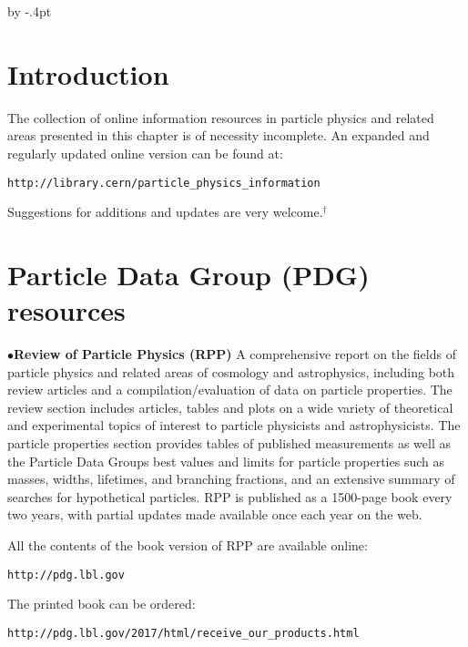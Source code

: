 %
\itemindent=10pt

\advance\baselineskip by -.4pt


\parindent=0pt
\def\url#1{\tt#1\rm}
\section{Introduction}%

The collection of online information resources in particle physics and related areas 
presented in this chapter is of necessity incomplete. An expanded and regularly updated 
online version can be found at: 

		\item{} \url{http://library.cern/particle\_physics\_information}

Suggestions for additions and updates are very welcome.$^\dagger$ 

\vglue -0.1in
\section{Particle Data Group (PDG) resources}%

\item{$\bullet$}{\bf Review of Particle Physics (RPP)}
A comprehensive report on the fields of particle physics and related areas of cosmology and astrophysics, including both review articles and a compilation/evaluation of data on particle properties. The review section includes articles, tables and plots on a wide variety of theoretical and experimental topics of interest to particle physicists and astrophysicists. The particle properties section provides tables of published measurements as well as the Particle Data Groups best values and limits for particle properties such as masses, widths, lifetimes, and branching fractions, and an extensive summary of searches for hypothetical particles. RPP is published as a 1500-page book every two years, with partial updates made available once each year on the web.

\item{} All the contents of the book version of RPP are available online:

         \item{}\quad\url{http://pdg.lbl.gov}

\item{} The printed book can be ordered:

         \item{}\quad\url{http://pdg.lbl.gov/2017/html/receive\_our\_products.html}

